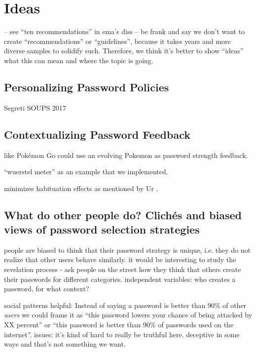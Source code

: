 \chapter[Ideas for Holistic Password Support]{Ideas}\label{chap:pst:ideas}
-- see ``ten recommendations'' in ema's diss
-- be frank and say we don't want to create ``recommendations'' or ``guidelines'', because it takes years and more diverse samples to solidify such. Therefore, we think it's better to show ``ideas'' what this can mean and where the topic is going. 


\section{Personalizing Password Policies}\label{sec:pst:personalizing-policies}

Segreti \etal SOUPS 2017
\cite{Seitz2017PPT}
\cite{Segreti2017AdaptivePolicies}

\section{Contextualizing Password Feedback}
like \cite{Kroeze2012GamifyingAuthentication} Pokémon Go could use an evolving Pokemon as password strength feedback. 

``wuerstel meter'' as an example that we implemented.

minimizes habituation effects as mentioned by Ur \etal \cite{Ur2012HelpingUsersCreateBetterPasswords}.

\section{What do other people do? Clichés and biased views of password selection strategies}
people are biased to think that their password strategy is unique, i.e. they do not realize that other users behave similarly. it would be interesting to study the revelation process - ask people on the street how they think that others create their passwords for different categories. independent variables: who creates a password, for what context?

social patterns helpful: Instead of saying a password is better than 90\% of other \textit{users} we could frame it as ``this password lowers your chance of being attacked by XX percent'' or ``this password is better than 90\% of passwords used on the internet''. issues: it's kind of hard to really be truthful here. deceptive in some ways and that's not something we want. 

